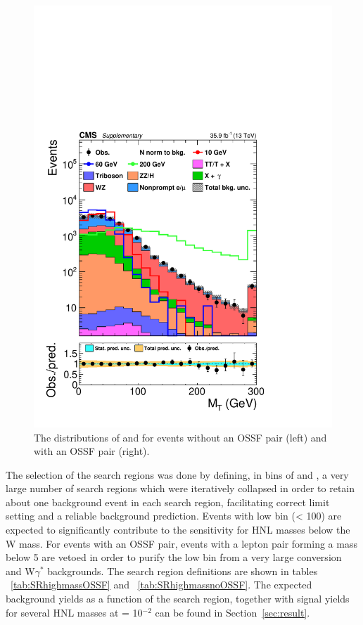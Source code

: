 \begin{figure}[h!]
\includegraphics[width=.4\textwidth]{Figures/c5/distribution/SR/mt_minMos_baseline_3lOSSF_withSignal_sigNormToBkg_log.pdf}
\caption{The distributions of \ptcone and \mtmin for
  events without an OSSF pair (left) and with an OSSF pair (right). \willem} 
\label{fig:mtminmm3lOSSF}
\end{figure}

The selection of the search regions was done by defining, in bins of
\mtmin and \mmin, a very large number of search regions which were
iteratively collapsed in order to retain about one background event in
each search region, facilitating correct limit setting and a reliable
background prediction. Events with low
\mlll bin (\mlll < 100\GeV) are expected to significantly contribute to
the sensitivity for HNL masses below the W mass. For events with an
OSSF pair, events with a lepton pair forming a mass below 5
\GeV are vetoed in order to purify the low \mlll bin from a very large
conversion and W$\gamma^{*}$ backgrounds. The search region definitions
are shown in tables ~\ref{tab:SRhighmassOSSF} and
~\ref{tab:SRhighmassnoOSSF}. The expected background yields as a
function of the search region, together with signal yields for several
HNL masses at \mixpar = 10$^{-2}$ can be found in 
Section~\ref{sec:result}.



